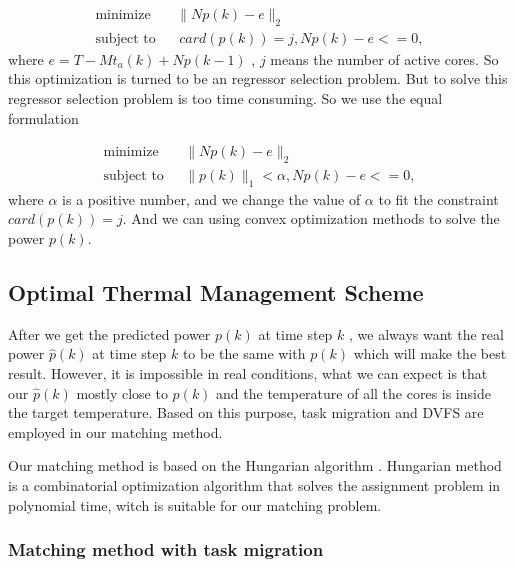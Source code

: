 

\begin{equation}
\begin{split}
\label{op_c} 
\text{minimize} &~~~\parallel Np(k)-e \parallel_2\\
\text{subject to} &~~~~card(p(k))=j,Np(k)-e<=0,
\end{split}
\end{equation}
where $e=T-Mt_{a}(k)+Np(k-1)$
,  $j$ means the number of active cores. So this optimization is turned to be an regressor selection problem. But to solve this regressor selection problem is too time consuming. So we use the equal formulation 

\begin{equation}
\begin{split}
\label{op_f} 
\text{minimize}  &~~~\parallel Np(k)-e \parallel_2\\
\text{subject to}  &~~~\parallel p(k) \parallel _1 < \alpha,Np(k)-e<=0,
\end{split}
\end{equation}
where
$\alpha$ is a positive number, and we change the value of $\alpha$ to fit the constraint $card(p(k))=j$. And we can using convex optimization methods \cite{Stephen:Convex_BOOK'09} to solve the power $p(k)$.


\subsection{Optimal Thermal Management Scheme}
After we get the predicted power $p(k)$ at time step $k$ , we always want the real power $\hat{p}(k)$ at time step $k$ to be the same with $p(k)$ which will make the best result. However, it is impossible in real conditions, what we can expect is that our $\hat{p}(k)$ mostly close to $p(k)$ and the temperature of all the cores is inside the target temperature. Based on this purpose, task migration and DVFS are employed in our matching method.


 Our matching method is based on the Hungarian algorithm \cite{Kuhn:NRLQ'55}. Hungarian method is a combinatorial optimization algorithm that solves the assignment problem in polynomial time, witch is suitable for our matching problem.

\subsubsection{Matching method with task migration}

